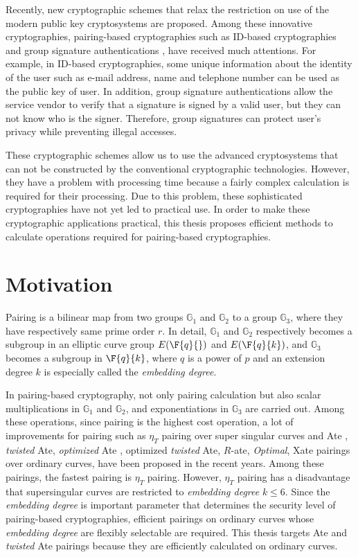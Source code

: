 Recently, new cryptographic schemes that relax the restriction on use of the modern public key cryptosystems are proposed.
Among these innovative cryptographies, pairing-based cryptographies such as ID-based cryptographies \cite{AC:BonLynSha01} and group signature authentications \cite{BBS}, \cite{nakanisi} have received much attentions.
For example, in ID-based cryptographies, some unique information about the identity of the user such as e-mail address, name and telephone number can be used as the public key of user.
In addition, group signature authentications allow the service vendor to verify that a signature is signed by a valid user, but they can not know who is the signer.
Therefore, group signatures can protect user's privacy while preventing illegal accesses.

These cryptographic schemes allow us to use the advanced cryptosystems that can not be constructed by the conventional cryptographic technologies.
However, they have a problem with processing time because a fairly complex calculation is required for their processing.  
Due to this problem, these sophisticated cryptographies have not yet led to practical use.   
In order to make these cryptographic applications practical, this thesis proposes efficient methods to calculate operations required for pairing-based cryptographies.

\section{Motivation}
Pairing is a bilinear map from two groups $\mathbb{G}_1$ and $\mathbb{G}_2$ to a group $\mathbb{G}_3$, where they have respectively same prime order $r$.
In detail, $\mathbb{G}_1$ and $\mathbb{G}_2$ respectively becomes a subgroup in an elliptic curve group $E(\F{q}{})$ and $E(\F{q}{k})$, and $\mathbb{G}_3$ becomes a subgroup in $\F{q}{k}$, where $q$ is a power of $p$ and an extension degree $k$ is especially called the {\it embedding degree}.
 
In pairing-based cryptography, not only pairing calculation but also scalar multiplications in $\mathbb{G}_1$ and $\mathbb{G}_2$, and exponentiations in $\mathbb{G}_3$ are carried out.
Among these operations, since pairing is the highest cost operation, a lot of improvements for pairing such as $\eta_T$ pairing over super singular curves and Ate \cite{PAIRING:Hess08}, {\it twisted} Ate\cite{PAIRING:Hess08}, {\it optimized} Ate \cite{EPRINT:MKHO07}, optimized {\it twisted} Ate\cite{EPRINT:MKHO07}, $R$-ate\cite{r_ate}, {\it Optimal}\cite{DBLP:journals/tit/Vercauteren10}, Xate \cite{PAIRING:NASKM08} pairings over ordinary curves, have been proposed in the recent years.
Among these pairings, the fastest pairing is $\eta_T$ pairing.
However, $\eta_T$ pairing has a disadvantage that supersingular curves are restricted to {\it embedding degree} $k\leq6$. 
Since the {\it embedding degree} is important parameter that determines the security level of pairing-based cryptographies, efficient pairings on ordinary curves whose {\it embedding degree} are flexibly selectable are required.
This thesis targets Ate and {\it twisted} Ate pairings because they are efficiently calculated on ordinary curves.
  
